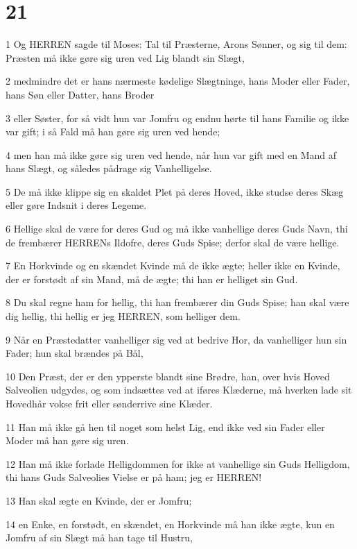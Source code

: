 \chapter{21}

\par 1 Og HERREN sagde til Moses: Tal til Præsterne, Arons Sønner, og sig til dem: Præsten må ikke gøre sig uren ved Lig blandt sin Slægt,
\par 2 medmindre det er hans nærmeste kødelige Slægtninge, hans Moder eller Fader, hans Søn eller Datter, hans Broder
\par 3 eller Søster, for så vidt hun var Jomfru og endnu hørte til hans Familie og ikke var gift; i så Fald må han gøre sig uren ved hende;
\par 4 men han må ikke gøre sig uren ved hende, når hun var gift med en Mand af hans Slægt, og således pådrage sig Vanhelligelse.
\par 5 De må ikke klippe sig en skaldet Plet på deres Hoved, ikke studse deres Skæg eller gøre Indsnit i deres Legeme.
\par 6 Hellige skal de være for deres Gud og må ikke vanhellige deres Guds Navn, thi de frembærer HERRENs Ildofre, deres Guds Spise; derfor skal de være hellige.
\par 7 En Horkvinde og en skændet Kvinde må de ikke ægte; heller ikke en Kvinde, der er forstødt af sin Mand, må de ægte; thi han er helliget sin Gud.
\par 8 Du skal regne ham for hellig, thi han frembærer din Guds Spise; han skal være dig hellig, thi hellig er jeg HERREN, som helliger dem.
\par 9 Når en Præstedatter vanhelliger sig ved at bedrive Hor, da vanhelliger hun sin Fader; hun skal brændes på Bål,
\par 10 Den Præst, der er den ypperste blandt sine Brødre, han, over hvis Hoved Salveolien udgydes, og som indsættes ved at iføres Klæderne, må hverken lade sit Hovedhår vokse frit eller sønderrive sine Klæder.
\par 11 Han må ikke gå hen til noget som helst Lig, end ikke ved sin Fader eller Moder må han gøre sig uren.
\par 12 Han må ikke forlade Helligdommen for ikke at vanhellige sin Guds Helligdom, thi hans Guds Salveolies Vielse er på ham; jeg er HERREN!
\par 13 Han skal ægte en Kvinde, der er Jomfru;
\par 14 en Enke, en forstødt, en skændet, en Horkvinde må han ikke ægte, kun en Jomfru af sin Slægt må han tage til Hustru,
